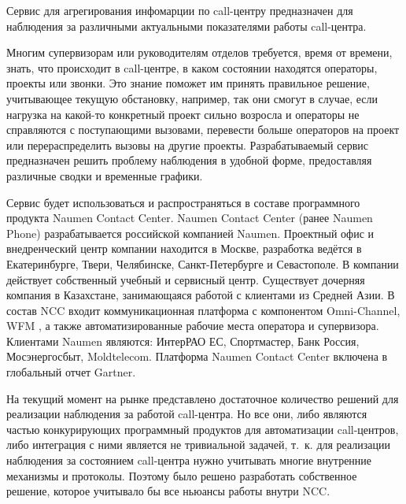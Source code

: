 \Introduction

Сервис для агрегирования инфомарции по call-центру предназначен для наблюдения за различными актуальными
показателями работы call-центра.

Многим супервизорам или руководителям отделов требуется, время от времени, знать,
что происходит в call-центре, в каком состоянии находятся операторы, проекты или звонки.
Это знание поможет им принять правильное решение, учитывающее текущую обстановку, например,
так они смогут в случае, если нагрузка на какой-то конкретный проект сильно возросла
и операторы не справляются с поступающими вызовами,
перевести больше операторов на проект или перераспределить вызовы на другие проекты.
Разрабатываемый сервис предназначен решить проблему наблюдения в удобной форме,
предоставляя различные сводки и временные графики.

Сервис будет использоваться и распространяться в составе программного продукта Naumen Contact Center.
Naumen Contact Center (ранее Naumen Phone) разрабатывается российской компанией Naumen.
Проектный офис и внедренческий центр компании находится в Москве, разработка ведётся в Екатеринбурге, Твери, Челябинске,
Санкт-Петербурге и Севастополе.
В компании действует собственный учебный и сервисный центр.
Существует дочерняя компания в Казахстане, занимающаяся работой с клиентами из Средней Азии.
В состав NCC входит коммуникационная платформа с компонентом Omni-Channel, WFM
,
а также автоматизированные рабочие места оператора и супервизора.
Клиентами Naumen являются:
ИнтерРАО
ЕС,
Спортмастер,
Банк
Россия,
Мосэнергосбыт,
Moldtelecom.
Платформа Naumen Contact Center включена в глобальный отчет Gartner.

На текущий момент на рынке представлено достаточное количество решений для реализации наблюдения за работой call-центра.
Но все они, либо являются частью конкурирующих программный продуктов для автоматизации call-центров,
либо интеграция с ними является не тривиальной задачей,
т.~к. для реализации наблюдения за состоянием call-центра нужно учитывать многие внутренние механизмы и протоколы.
Поэтому было решено разработать собственное решение, которое учитывало бы все ньюансы работы внутри NCC.

